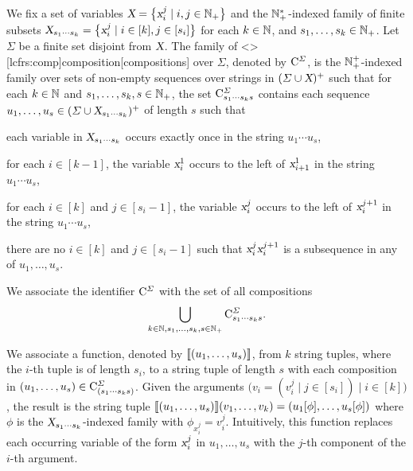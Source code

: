 \documentclass[../document.tex]{subfiles}
\begin{document}
    \begin{definition}[Compositions]\label{def:lcfrs:comp}
        We fix a set of variables \(\textsl{X} = \big\{ \textsl{x}_i^j \mid i, j \in \mathbb{N}_+ \big\}\) and the \(\mathbb{N}_+^*\)-indexed family of finite subsets \(\textsl{X}_{s_1\cdots s_k} = \big\{ \textsl{x}_i^j \mid i \in [k], j \in [s_i] \big\}\) for each \(k \in \mathbb{N}\), and \(s_1, \ldots, s_k \in \mathbb{N}_+\).
        Let \(\varSigma\) be a finite set disjoint from \(\textsl{X}\).
        The family of  <\lcfrs>[lcfrs:comp]{composition}[compositions] over \(\varSigma\), denoted by \(\mathrm{C}^\varSigma\), is the \(\mathbb{N}_+^+\)-indexed family over sets of non-empty sequences over strings in \((\varSigma \cup \textsl{X})^+\) such that for each \(k \in \mathbb{N}\) and \(s_1, \ldots, s_k, s \in \mathbb{N}_+\), the set \(\mathrm{C}^\varSigma_{s_1 \cdots s_k s}\) contains each sequence \(u_1, \ldots, u_s \in (\varSigma \cup \textsl{X}_{s_1 \cdots s_k})^+\) of length \(s\) such that
        \begin{compactenum}[(i)]
            \item each variable in \(\textsl{X}_{s_1 \cdots s_k}\) occurs exactly once in the string \(u_1 \cdots u_s\),
            \item for each \(i \in [k-1]\), the variable \(\textsl{x}_i^1\) occurs to the left of \(\textsl{x}_{i+1}^1\) in the string \(u_1 \cdots u_s\),
            \item for each \(i \in [k]\) and \(j \in [s_i-1]\), the variable \(\textsl{x}_i^j\) occurs to the left of \(\textsl{x}_i^{j+1}\) in the string \(u_1 \cdots u_s\),
            \item there are no \(i \in [k]\) and \(j \in [s_i-1]\) such that \(\textsl{x}^j_i\textsl{x}^{j+1}_i\) is a subsequence in any of \(u_1, \ldots, u_s\).
        \end{compactenum}
        We associate the identifier \(\mathrm{C}^\varSigma\) with the set of all  compositions \[
            \bigcup_{k \in \mathbb{N}, s_1, \ldots, s_k, s \in \mathbb{N}_+} \mathrm{C}^{\varSigma}_{s_1 \cdots s_k s} \text{.}
        \]

        We associate a function, denoted by \(\llbracket(u_1, \ldots, u_s)\rrbracket\), from \(k\) string tuples, where the \(i\)-th tuple is of length \(s_i\), to a string tuple of length \(s\) with each composition in \((u_1, \ldots, u_s) \in \mathrm{C}^\varSigma_{(s_1\cdots s_k s)}\).
        Given the arguments \(\big(v_i = (v_i^j \mid j \in [s_i]) \mid i \in [k]\big)\), the result is the string tuple \(
            \llbracket(u_1, \ldots, u_s)\rrbracket(v_1, \ldots, v_k) = (u_1[\phi], \ldots, u_s[\phi])
        \) where \(\phi\) is the \(\textsl{X}_{s_1 \cdots s_k}\)-indexed family with \(\phi_{x_i^j} = v_i^j\).
        Intuitively, this function replaces each occurring variable of the form \(\textsl{x}_i^j\) in \(u_1, \ldots, u_s\) with the \(j\)-th component of the \(i\)-th argument.
    \end{definition}
\end{document}
